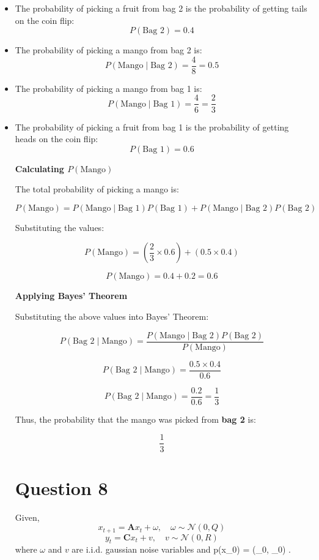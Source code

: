 \documentclass[12pt]{article}
\begin{document}
\begin{itemize}
    \item The probability of picking a fruit from bag 2 is the probability of getting tails on the coin flip:
\[
P(\text{Bag 2}) = 0.4
\]

    \item The probability of picking a mango from bag 2 is:
\[
P(\text{Mango} \mid \text{Bag 2}) = \frac{4}{8} = 0.5
\]

    \item The probability of picking a mango from bag 1 is:
\[
P(\text{Mango} \mid \text{Bag 1}) = \frac{4}{6} = \frac{2}{3}
\]

    \item The probability of picking a fruit from bag 1 is the probability of getting heads on the coin flip:
\[
P(\text{Bag 1}) = 0.6
\]

\textbf{Calculating \( P(\text{Mango}) \)}

The total probability of picking a mango is:

\[
P(\text{Mango}) = P(\text{Mango} \mid \text{Bag 1}) P(\text{Bag 1}) + P(\text{Mango} \mid \text{Bag 2}) P(\text{Bag 2})
\]

Substituting the values:

\[
P(\text{Mango}) = \left( \frac{2}{3} \times 0.6 \right) + \left( 0.5 \times 0.4 \right)
\]

\[
P(\text{Mango}) = 0.4 + 0.2 = 0.6
\]

\textbf{Applying Bayes' Theorem}

Substituting the above values into Bayes' Theorem:

\[
P(\text{Bag 2} \mid \text{Mango}) = \frac{P(\text{Mango} \mid \text{Bag 2}) P(\text{Bag 2})}{P(\text{Mango})}
\]

\[
P(\text{Bag 2} \mid \text{Mango}) = \frac{0.5 \times 0.4}{0.6}
\]

\[
P(\text{Bag 2} \mid \text{Mango}) = \frac{0.2}{0.6} = \frac{1}{3}
\]

Thus, the probability that the mango was picked from \textbf{bag 2} is:

\[
\boxed{\frac{1}{3}}
\]

\section*{Question 8}

Given,
\[
x_{t+1} = \mathbf{A} x_t + \omega, \quad \omega \sim \mathcal{N}(0, Q)
\]
\[
y_t = \mathbf{C} x_t + v, \quad v \sim \mathcal{N}(0, R)
\]
where \( \omega \) and \( v \) are i.i.d. gaussian noise variables and p(x_0) = (\mu_0, \Sigma_0) \).


\end{itemize}
\end{document}

